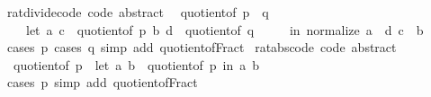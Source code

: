 \begin{isabellebody}
\isamarkupfalse%
%
\endisatagproof
{\isafoldproof}%
%
\isadelimproof
\isanewline
%
\endisadelimproof
\isanewline
{}\isamarkupfalse%
\ rat{\isacharunderscore}{\kern0pt}divide{\isacharunderscore}{\kern0pt}code\ {\isacharbrackleft}{\kern0pt}code\ abstract{\isacharbrackright}{\kern0pt}{\isacharcolon}{\kern0pt}\isanewline
\ \ {\isachardoublequoteopen}quotient{\isacharunderscore}{\kern0pt}of\ {\isacharparenleft}{\kern0pt}p\ {\isacharslash}{\kern0pt}\ q{\isacharparenright}{\kern0pt}\ {\isacharequal}{\kern0pt}\isanewline
\ \ \ \ {\isacharparenleft}{\kern0pt}let\ {\isacharparenleft}{\kern0pt}a{\isacharcomma}{\kern0pt}\ c{\isacharparenright}{\kern0pt}\ {\isacharequal}{\kern0pt}\ quotient{\isacharunderscore}{\kern0pt}of\ p{\isacharsemicolon}{\kern0pt}\ {\isacharparenleft}{\kern0pt}b{\isacharcomma}{\kern0pt}\ d{\isacharparenright}{\kern0pt}\ {\isacharequal}{\kern0pt}\ quotient{\isacharunderscore}{\kern0pt}of\ q\isanewline
\ \ \ \ \ in\ normalize\ {\isacharparenleft}{\kern0pt}a\ {\isacharasterisk}{\kern0pt}\ d{\isacharcomma}{\kern0pt}\ c\ {\isacharasterisk}{\kern0pt}\ b{\isacharparenright}{\kern0pt}{\isacharparenright}{\kern0pt}{\isachardoublequoteclose}\isanewline
%
\isadelimproof
\ \ %
\endisadelimproof
%
\isatagproof
{}\isamarkupfalse%
\ {\isacharparenleft}{\kern0pt}cases\ p{\isacharcomma}{\kern0pt}\ cases\ q{\isacharparenright}{\kern0pt}\ {\isacharparenleft}{\kern0pt}simp\ add{\isacharcolon}{\kern0pt}\ quotient{\isacharunderscore}{\kern0pt}of{\isacharunderscore}{\kern0pt}Fract{\isacharparenright}{\kern0pt}%
\endisatagproof
{\isafoldproof}%
%
\isadelimproof
\isanewline
%
\endisadelimproof
\isanewline
{}\isamarkupfalse%
\ rat{\isacharunderscore}{\kern0pt}abs{\isacharunderscore}{\kern0pt}code\ {\isacharbrackleft}{\kern0pt}code\ abstract{\isacharbrackright}{\kern0pt}{\isacharcolon}{\kern0pt}\isanewline
\ \ {\isachardoublequoteopen}quotient{\isacharunderscore}{\kern0pt}of\ {\isasymbar}p{\isasymbar}\ {\isacharequal}{\kern0pt}\ {\isacharparenleft}{\kern0pt}let\ {\isacharparenleft}{\kern0pt}a{\isacharcomma}{\kern0pt}\ b{\isacharparenright}{\kern0pt}\ {\isacharequal}{\kern0pt}\ quotient{\isacharunderscore}{\kern0pt}of\ p\ in\ {\isacharparenleft}{\kern0pt}{\isasymbar}a{\isasymbar}{\isacharcomma}{\kern0pt}\ b{\isacharparenright}{\kern0pt}{\isacharparenright}{\kern0pt}{\isachardoublequoteclose}\isanewline
%
\isadelimproof
\ \ %
\endisadelimproof
%
\isatagproof
{}\isamarkupfalse%
\ {\isacharparenleft}{\kern0pt}cases\ p{\isacharparenright}{\kern0pt}\ {\isacharparenleft}{\kern0pt}simp\ add{\isacharcolon}{\kern0pt}\ quotient{\isacharunderscore}{\kern0pt}of{\isacharunderscore}{\kern0pt}Fract{\isacharparenright}{\kern0pt}%

\end{isabellebody}
